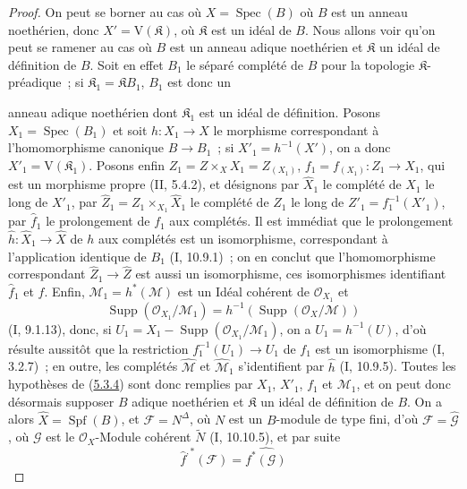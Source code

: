 \begin{proof}
On peut se borner au cas où $X=\operatorname{Spec}(B)$ où $B$ est un anneau
noethérien, donc $X'=\mathrm V(\mathfrak K)$, où $\mathfrak K$ est un idéal de
$B$. Nous allons voir qu'on peut se ramener au cas où $B$ est un anneau adique
noethérien et $\mathfrak K$ un idéal de définition de $B$. Soit en effet $B_1$ le
séparé complété de $B$ pour la topologie $\mathfrak K$-préadique~; si
$\mathfrak K_1=\mathfrak K B_1$, $B_1$ est donc un


anneau adique noethérien dont $\mathfrak K_1$ est un idéal de définition. Posons
$X_1=\operatorname{Spec}(B_1)$ et soit $h:X_1\to X$ le morphisme correspondant à
l'homomorphisme canonique $B\to B_1$~; si $X'_1=h^{-1}(X')$, on a donc
$X'_1=\mathrm V(\mathfrak K_1)$. Posons enfin
$Z_1=Z\times_X X_1=Z_{(X_1)}$, $f_1=f_{(X_1)}:Z_1\to X_1$, qui est un morphisme
propre (II, 5.4.2), et désignons par $\widehat X_1$ le complété de $X_1$ le long
de $X'_1$, par
$\widehat Z_1=Z_1\times_{X_1}\widehat X_1$ le complété de $Z_1$ le long de
$Z'_1=f_1^{-1}(X'_1)$, par $\widehat f_1$ le prolongement de $f_1$ aux complétés.
Il est immédiat que le prolongement $\widehat h:\widehat X_1\to\widehat X$ de $h$
aux complétés est un isomorphisme, correspondant à l'application identique de $B_1$
(I, 10.9.1)~; on en conclut que l'homomorphisme correspondant
$\widehat Z_1\to\widehat Z$ est aussi un isomorphisme, ces isomorphismes identifiant
$\widehat f_1$ et $\widehat f$. Enfin,
$\mathcal M_1=h^*(\mathcal M)$ est un Idéal cohérent de $\mathcal O_{X_1}$ et
\[
\operatorname{Supp}(\mathcal O_{X_1}/\mathcal M_1)
=h^{-1}(\operatorname{Supp}(\mathcal O_X/\mathcal M))
\]
(I, 9.1.13), donc, si
$U_1=X_1-\operatorname{Supp}(\mathcal O_{X_1}/\mathcal M_1)$, on a
$U_1=h^{-1}(U)$, d'où résulte aussitôt que la restriction
$f_1^{-1}(U_1)\to U_1$ de $f_1$ est un isomorphisme (I, 3.2.7)~; en outre, les
complétés $\widehat{\mathcal M}$ et $\widehat{\mathcal M}_1$ s'identifient par
$\widehat h$ (I, 10.9.5). Toutes les hypothèses de
(\hyperref[III.5.3.4-fr]{5.3.4}) sont donc remplies par $X_1$, $X'_1$, $f_1$ et
$\mathcal M_1$, et on peut donc désormais supposer $B$ adique noethérien et
$\mathfrak K$ un idéal de définition de $B$. On a alors
$\widehat X=\operatorname{Spf}(B)$, et $\mathcal F=N^\Delta$, où $N$ est un
$B$-module de type fini, d'où $\mathcal F=\widehat{\mathcal G}$, où $\mathcal G$
est le $\mathcal O_X$-Module cohérent $\widetilde N$ (I, 10.10.5), et par suite
\[
\widehat f^{,*}(\mathcal F)=\widehat{f^*(\mathcal G)}
\]
\end{proof}
